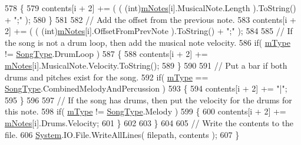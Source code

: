 \begin{DoxyCode}
578             \{
579                 contents[i + 2] += ( ( (int)\hyperlink{group___song_priv_var_ga674bc904a1f856d485d5fb7fe84bac85}{mNotes}[i].MusicalNote.Length ).ToString() + \textcolor{stringliteral}{";"} );
580             \}
581 
582             \textcolor{comment}{// Add the offset from the previous note.}
583             contents[i + 2] += ( ( (int)\hyperlink{group___song_priv_var_ga674bc904a1f856d485d5fb7fe84bac85}{mNotes}[i].OffsetFromPrevNote ).ToString() + \textcolor{stringliteral}{";"} );
584 
585             \textcolor{comment}{// If the song is not a drum loop, then add the musical note velocity.}
586             \textcolor{keywordflow}{if}( \hyperlink{group___song_priv_var_gaf3b9d0f461522324f897b746311b43c5}{mType} != \hyperlink{group___song_enums_gae681a1f001333e39fc1cb4fea97bfe1b}{SongType}.DrumLoop )
587             \{
588                 contents[i + 2] += \hyperlink{group___song_priv_var_ga674bc904a1f856d485d5fb7fe84bac85}{mNotes}[i].MusicalNote.Velocity.ToString();
589             \}
590 
591             \textcolor{comment}{// Put a bar if both drums and pitches exist for the song.}
592             \textcolor{keywordflow}{if}( \hyperlink{group___song_priv_var_gaf3b9d0f461522324f897b746311b43c5}{mType} == \hyperlink{group___song_enums_gae681a1f001333e39fc1cb4fea97bfe1b}{SongType}.CombinedMelodyAndPercussion )
593             \{
594                 contents[i + 2] += \textcolor{stringliteral}{"|"};
595             \}
596 
597             \textcolor{comment}{// If the song has drums, then put the velocity for the drums for this note.}
598             \textcolor{keywordflow}{if}( \hyperlink{group___song_priv_var_gaf3b9d0f461522324f897b746311b43c5}{mType} != \hyperlink{group___song_enums_gae681a1f001333e39fc1cb4fea97bfe1b}{SongType}.Melody )
599             \{
600                 contents[i + 2] += \hyperlink{group___song_priv_var_ga674bc904a1f856d485d5fb7fe84bac85}{mNotes}[i].Drums.Velocity;
601             \}
602 
603         \}
604 
605         \textcolor{comment}{// Write the contents to the file.}
606         \hyperlink{namespace_system}{System}.IO.File.WriteAllLines( filepath, contents );
607     \}
\end{DoxyCode}
